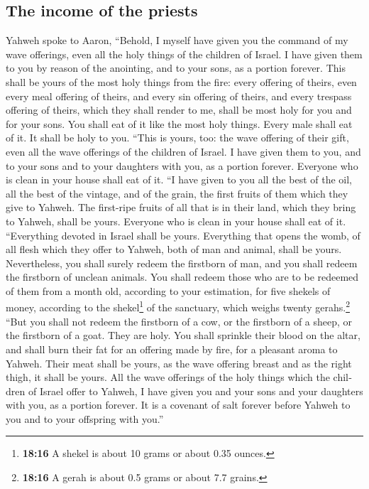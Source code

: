 \begin{paracol}{2}
\begin{otherlanguage}{english}
\hypertarget{the-income-of-the-priests}{%
\subsection{The income of the priests}\label{the-income-of-the-priests}}

 Yahweh spoke to Aaron, ``Behold, I myself have given you
the command of my wave offerings, even all the holy things of the
children of Israel. I have given them to you by reason of the anointing,
and to your sons, as a portion forever.  This shall be
yours of the most holy things from the fire: every offering of theirs,
even every meal offering of theirs, and every sin offering of theirs,
and every trespass offering of theirs, which they shall render to me,
shall be most holy for you and for your sons.  You shall
eat of it like the most holy things. Every male shall eat of it. It
shall be holy to you.  ``This is yours, too: the wave
offering of their gift, even all the wave offerings of the children of
Israel. I have given them to you, and to your sons and to your daughters
with you, as a portion forever. Everyone who is clean in your house
shall eat of it.  ``I have given to you all the best of
the oil, all the best of the vintage, and of the grain, the first fruits
of them which they give to Yahweh.  The first-ripe fruits
of all that is in their land, which they bring to Yahweh, shall be
yours. Everyone who is clean in your house shall eat of it.
 ``Everything devoted in Israel shall be yours.
 Everything that opens the womb, of all flesh which they
offer to Yahweh, both of man and animal, shall be yours. Nevertheless,
you shall surely redeem the firstborn of man, and you shall redeem the
firstborn of unclean animals.  You shall redeem those who
are to be redeemed of them from a month old, according to your
estimation, for five shekels of money, according to the
shekel\footnote{\textbf{18:16} A shekel is about 10 grams or about 0.35
  ounces.} of the sanctuary, which weighs twenty gerahs.\footnote{\textbf{18:16}
  A gerah is about 0.5 grams or about 7.7 grains.}  ``But
you shall not redeem the firstborn of a cow, or the firstborn of a
sheep, or the firstborn of a goat. They are holy. You shall sprinkle
their blood on the altar, and shall burn their fat for an offering made
by fire, for a pleasant aroma to Yahweh.  Their meat
shall be yours, as the wave offering breast and as the right thigh, it
shall be yours.  All the wave offerings of the holy
things which the children of Israel offer to Yahweh, I have given you
and your sons and your daughters with you, as a portion forever. It is a
covenant of salt forever before Yahweh to you and to your offspring with
you.''


\end{otherlanguage}
\end{paracol}
